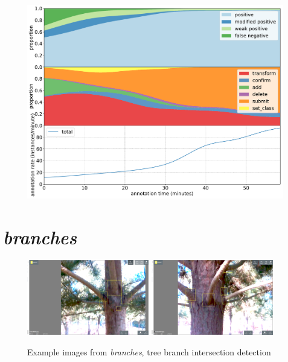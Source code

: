 \begin{figure}[!h]
\centering
\includegraphics[width=1.0\linewidth]{charts/action_annotations/fisheye.pdf}
\caption{  }
\label{fig:fisheye_annotation}
\end{figure}


\pagebreak
\section{\emph{branches}}


\begin{figure}[!h]
  \includegraphics[width=0.475\textwidth]{figures/annotation/screenshots/branches3.png}
  \includegraphics[width=0.475\textwidth]{figures/annotation/screenshots/branches2.png}  
  
  \caption{Example images from \emph{branches}, tree branch intersection detection}
\end{figure}

